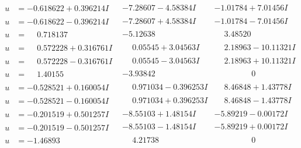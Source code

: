\documentclass[1p]{elsarticle_modified}
\theoremstyle{definition}
\begin{document}
$$\begin{array}{c|c|c}
\begin{aligned}
u &= -0.618622 + 0.396214 I\end{aligned}
 & -7.28607 - 4.58384 I & -1.01784 + 7.01456 I \\ \hline\begin{aligned}
u &= -0.618622 - 0.396214 I\end{aligned}
 & -7.28607 + 4.58384 I & -1.01784 - 7.01456 I \\ \hline\begin{aligned}
u &= \phantom{-}0.718137\phantom{ +0.000000I}\end{aligned}
 & -5.12638\phantom{ +0.000000I} & \phantom{-}3.48520\phantom{ +0.000000I} \\ \hline\begin{aligned}
u &= \phantom{-}0.572228 + 0.316761 I\end{aligned}
 & \phantom{-}0.05545 + 3.04563 I & \phantom{-}2.18963 - 10.11321 I \\ \hline\begin{aligned}
u &= \phantom{-}0.572228 - 0.316761 I\end{aligned}
 & \phantom{-}0.05545 - 3.04563 I & \phantom{-}2.18963 + 10.11321 I \\ \hline\begin{aligned}
u &= \phantom{-}1.40155\phantom{ +0.000000I}\end{aligned}
 & -3.93842\phantom{ +0.000000I} & \phantom{-0.000000 } 0 \\ \hline\begin{aligned}
u &= -0.528521 + 0.160054 I\end{aligned}
 & \phantom{-}0.971034 - 0.396253 I & \phantom{-}8.46848 + 1.43778 I \\ \hline\begin{aligned}
u &= -0.528521 - 0.160054 I\end{aligned}
 & \phantom{-}0.971034 + 0.396253 I & \phantom{-}8.46848 - 1.43778 I \\ \hline\begin{aligned}
u &= -0.201519 + 0.501257 I\end{aligned}
 & -8.55103 + 1.48154 I & -5.89219 - 0.00172 I \\ \hline\begin{aligned}
u &= -0.201519 - 0.501257 I\end{aligned}
 & -8.55103 - 1.48154 I & -5.89219 + 0.00172 I \\ \hline\begin{aligned}
u &= -1.46893\phantom{ +0.000000I}\end{aligned}
 & \phantom{-}4.21738\phantom{ +0.000000I} & \phantom{-0.000000 } 0 \\ \hline\begin{aligned}

\end{aligned}
\end{array}$$
\end{document}
